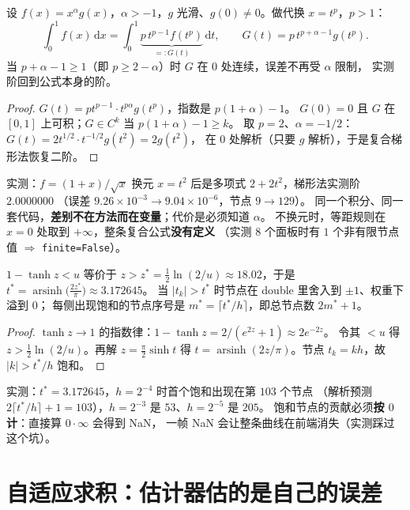 \begin{theorem}[换元恢复阶]
\label{thm:sub}
设 $f(x)=x^\alpha g(x)$，$\alpha>-1$，$g$ 光滑、$g(0)\ne0$。做代换 $x=t^{p}$，$p>1$：
\[
  \int_0^1f(x)\,\mathrm{d}x=\int_0^1 \underbrace{p\,t^{p-1}f(t^p)}_{=:G(t)}\,\mathrm{d}t,
  \qquad G(t)=p\,t^{p+\alpha-1}g(t^p).
\]
当 $p+\alpha-1\ge1$（即 $p\ge2-\alpha$）时 $G$ 在 $0$ 处连续，误差不再受 $\alpha$ 限制，
实测阶回到公式本身的阶。
\end{theorem}

\begin{proof}
$G(t)=pt^{p-1}\cdot t^{p\alpha}g(t^p)$，指数是 $p(1+\alpha)-1$。
$G(0)=0$ 且 $G$ 在 $[0,1]$ 上可积；$G\in C^{k}$ 当 $p(1+\alpha)-1\ge k$。
取 $p=2$、$\alpha=-1/2$：$G(t)=2t^{1/2}\cdot t^{-1/2}g(t^2)=2g(t^2)$，
在 $0$ 处解析（只要 $g$ 解析），于是复合梯形法恢复二阶。
\end{proof}

实测：$f=(1+x)/\sqrt x$ 换元 $x=t^2$ 后是多项式 $2+2t^2$，梯形法实测阶 $2.0000000$
（误差 $9.26\times10^{-3}\to9.04\times10^{-6}$，节点 $9\to129$）。
同一个积分、同一套代码，\textbf{差别不在方法而在变量}；代价是必须知道 $\alpha$。
不换元时，等距规则在 $x=0$ 处取到 $+\infty$，整条复合公式\textbf{没有定义}
（实测 $8$ 个面板时有 $1$ 个非有限节点值 $\Rightarrow$ \texttt{finite=False}）。

\begin{theorem}[饱和节点]
\label{thm:sat}
$1-\tanh z<u$ 等价于 $z>z^\ast=\tfrac12\ln(2/u)\approx18.02$，于是
$t^\ast=\operatorname{arsinh}\bigl(\tfrac{2z^\ast}\pi\bigr)\approx3.172645$。
当 $|t_k|>t^\ast$ 时节点在 double 里舍入到 $\pm1$、权重下溢到 $0$；
每侧出现饱和的节点序号是 $m^\ast=\lceil t^\ast/h\rceil$，即总节点数 $2m^\ast+1$。
\end{theorem}

\begin{proof}
$\tanh z\to1$ 的指数律：$1-\tanh z=2/(e^{2z}+1)\approx2e^{-2z}$。
令其 $<u$ 得 $z>\tfrac12\ln(2/u)$。再解 $z=\tfrac\pi2\sinh t$ 得
$t=\operatorname{arsinh}(2z/\pi)$。节点 $t_k=kh$，故 $|k|>t^\ast/h$ 饱和。
\end{proof}

实测：$t^\ast=3.172645$，$h=2^{-4}$ 时首个饱和出现在第 $103$ 个节点
（解析预测 $2\lceil t^\ast/h\rceil+1=103$），$h=2^{-3}$ 是 $53$、$h=2^{-5}$ 是 $205$。
饱和节点的贡献必须\textbf{按 $0$ 计}：直接算 $0\cdot\infty$ 会得到 NaN，
一帧 NaN 会让整条曲线在前端消失（实测踩过这个坑）。

\section{自适应求积：估计器估的是自己的误差}

